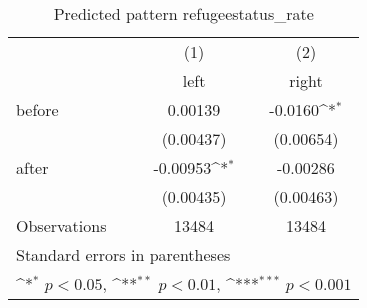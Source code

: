 \begin{table}[htbp]\centering
\def\sym#1{\ifmmode^{#1}\else\(^{#1}\)\fi}
\caption{Predicted pattern refugeestatus\_rate}
\begin{tabular}{l*{2}{c}}
\hline\hline
                    &\multicolumn{1}{c}{(1)}&\multicolumn{1}{c}{(2)}\\
                    &\multicolumn{1}{c}{left}&\multicolumn{1}{c}{right}\\
\hline
before              &     0.00139         &     -0.0160\sym{*}  \\
                    &   (0.00437)         &   (0.00654)         \\
[1em]
after               &    -0.00953\sym{*}  &    -0.00286         \\
                    &   (0.00435)         &   (0.00463)         \\
\hline
Observations        &       13484         &       13484         \\
\hline\hline
\multicolumn{3}{l}{\footnotesize Standard errors in parentheses}\\
\multicolumn{3}{l}{\footnotesize \sym{*} \(p<0.05\), \sym{**} \(p<0.01\), \sym{***} \(p<0.001\)}\\
\end{tabular}
\end{table}
